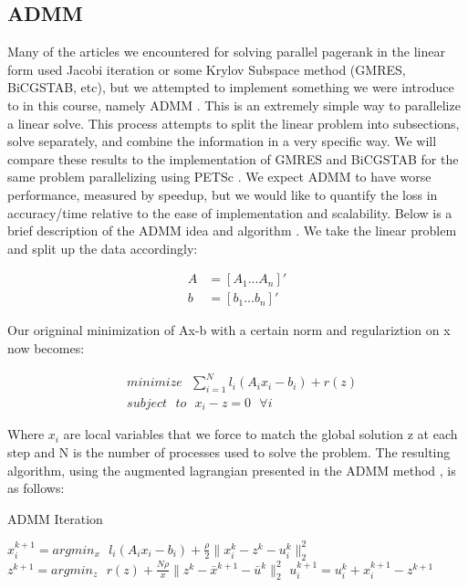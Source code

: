 \documentclass[a4paper,10pt]{article}
\begin{document}
\subsection{ADMM}

Many of the articles we encountered for solving parallel pagerank in the linear form used Jacobi iteration or some Krylov Subspace method (GMRES, BiCGSTAB, etc), but we attempted to implement something we were introduce to in this course, namely ADMM \cite{ADMM}. This is an extremely simple way to parallelize a linear solve. This process attempts to split the linear problem into subsections, solve separately, and combine the information in a very specific way. 
We will compare these results to the implementation of GMRES and BiCGSTAB for the same problem parallelizing using PETSc \cite{Power Law Graphs}. We expect ADMM to have worse performance, measured by speedup, but we would like to quantify the loss in accuracy/time relative to the ease of implementation and scalability.
\newline
\linebreak
Below is a brief description of the ADMM idea and algorithm \cite{ADMM}.
\newline
We take the linear problem and split up the data accordingly:
\begin{center}
\begin{align}
	A &= \left[ A_{1} ... A_{n} \right]' \\
	b &= \left[ b_{1} ... b_{n} \right]' 
\end{align}
\end{center}
Our origninal minimization of Ax-b with a certain norm and regulariztion on x now becomes:

\begin{center}
\begin{align}
	&minimize \: \: \: \sum_{i=1}^{N} l_{i}(A_{i}x_{i} - b_{i}) + r(z) \\
	&subject \: \: \: to \: \: \: x_{i} - z = 0 \: \: \: \forall i
\end{align}
\end{center}
Where $x_{i}$ are local variables that we force to match the global solution z at each step and N is the number of processes used to solve the problem.
\newline
The resulting algorithm, using the augmented lagrangian presented in the ADMM method \cite{ADMM}, is as follows:

\begin{center}
\begin{algorithm}
\caption{ADMM Iteration}
\begin{algorithmic}[1]
	\STATE $x_{i}^{k+1} = argmin_{x} \: \: \: l_{i}(A_{i}x_{i} - b_{i}) + \frac{\rho}{2} \| x_{i}^{k} - z^{k} - u_{i}^{k} \|_{2}^{2}$ 
	\STATE $z^{k+1} = argmin_{z} \: \: \: r(z) + \frac{N \rho}{x} \| z^{k} - \bar{x}^{k+1} - \bar{u}^{k} \|_{2}^{2} $
	\STATE $u_{i}^{k+1} = u_{i}^{k} + x_{i}^{k+1} - z^{k+1} $ 
  \end{algorithmic}
\end{algorithm}
\end{center}
\end{document}
